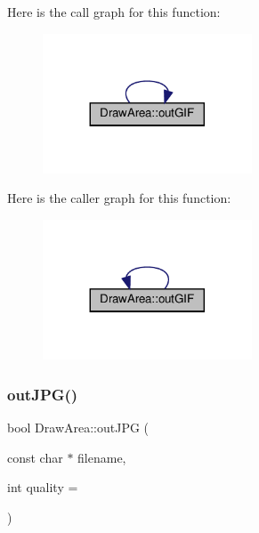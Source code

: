 Here is the call graph for this function\+:
\nopagebreak
\begin{figure}[H]
\begin{center}
\leavevmode
\includegraphics[width=176pt]{class_draw_area_aa3b58d71f07e7e558ad8895b0ea9ba95_cgraph}
\end{center}
\end{figure}
Here is the caller graph for this function\+:
\nopagebreak
\begin{figure}[H]
\begin{center}
\leavevmode
\includegraphics[width=176pt]{class_draw_area_aa3b58d71f07e7e558ad8895b0ea9ba95_icgraph}
\end{center}
\end{figure}
\mbox{\label{class_draw_area_aab0ce24f4d0cb06f7b4618a7d1784c62}} 
\subsubsection{\texorpdfstring{out\+J\+P\+G()}{outJPG()}\hspace{0.1cm}{\footnotesize\ttfamily [1/3]}}
{\footnotesize\ttfamily bool Draw\+Area\+::out\+J\+PG (\begin{DoxyParamCaption}\item[{const char $\ast$}]{filename,  }\item[{int}]{quality = {} }\end{DoxyParamCaption})\hspace{0.3cm}{\ttfamily [inline]}}



